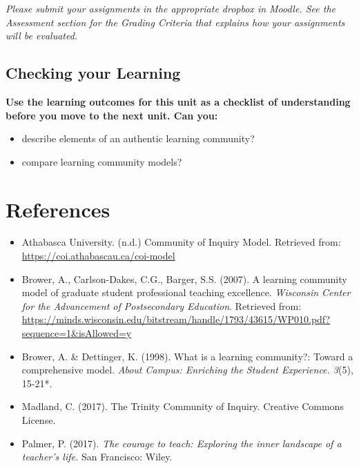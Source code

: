 \documentclass[
]{book}
\providecommand{\tightlist}{%
  \setlength{\itemsep}{0pt}\setlength{\parskip}{0pt}}
\begin{document}
\begin{caution}
\emph{Please submit your assignments in the appropriate dropbox in
Moodle. See the Assessment section for the Grading Criteria that
explains how your assignments will be evaluated.}
\end{caution}

\hypertarget{checking-your-learning-3}{%
\subsection*{Checking your Learning}\label{checking-your-learning-3}}

\begin{progress}
\textbf{Use the learning outcomes for this unit as a checklist of
understanding before you move to the next unit. Can you:}

\begin{itemize}
\tightlist
\item
  describe elements of an authentic learning community?\\
\item
  compare learning community models?
\end{itemize}
\end{progress}

\hypertarget{references-1}{%
\section*{References}\label{references-1}}

\begin{itemize}
\tightlist
\item
  Athabasca University. (n.d.) Community of Inquiry Model. Retrieved from: \url{https://coi.athabascau.ca/coi-model}\\
\item
  Brower, A., Carlson-Dakes, C.G., Barger, S.S. (2007). A learning community model of graduate student professional teaching excellence. \emph{Wisconsin Center for the Advancement of Postsecondary Education}. Retrieved from: \url{https://minds.wisconsin.edu/bitstream/handle/1793/43615/WP010.pdf?sequence=1\&isAllowed=y}\\
\item
  Brower, A. \& Dettinger, K. (1998). What is a learning community?: Toward a comprehensive model. \emph{About Campus: Enriching the Student Experience. 3}(5), 15-21*.\\
\item
  Madland, C. (2017). The Trinity Community of Inquiry. Creative Commons License.\\
\item
  Palmer, P. (2017). \emph{The courage to teach: Exploring the inner landscape of a teacher's life.} San Francisco: Wiley.
\end{itemize}
\end{document}
